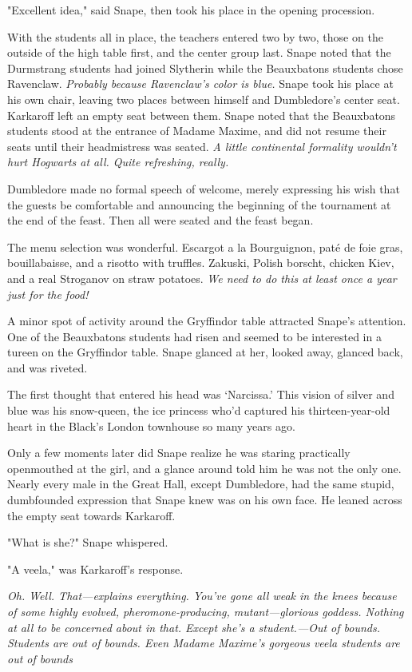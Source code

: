 "Excellent idea," said Snape, then took his place in the opening procession.

With the students all in place, the teachers entered two by two, those on the outside of the high table first, and the center group last. Snape noted that the Durmstrang students had joined Slytherin while the Beauxbatons students chose Ravenclaw. \emph{Probably because Ravenclaw's color is blue.} Snape took his place at his own chair, leaving two places between himself and Dumbledore's center seat. Karkaroff left an empty seat between them. Snape noted that the Beauxbatons students stood at the entrance of Madame Maxime, and did not resume their seats until their headmistress was seated. \emph{A little continental formality wouldn't hurt Hogwarts at all. Quite refreshing, really.}

Dumbledore made no formal speech of welcome, merely expressing his wish that the guests be comfortable and announcing the beginning of the tournament at the end of the feast. Then all were seated and the feast began.

The menu selection was wonderful. Escargot a la Bourguignon, paté de foie gras, bouillabaisse, and a risotto with truffles. Zakuski, Polish borscht, chicken Kiev, and a real Stroganov on straw potatoes. \emph{We need to do this at least once a year just for the food!}

A minor spot of activity around the Gryffindor table attracted Snape's attention. One of the Beauxbatons students had risen and seemed to be interested in a tureen on the Gryffindor table. Snape glanced at her, looked away, glanced back, and was riveted.

The first thought that entered his head was `Narcissa.' This vision of silver and blue was his snow-queen, the ice princess who'd captured his thirteen-year-old heart in the Black's London townhouse so many years ago.

Only a few moments later did Snape realize he was staring practically openmouthed at the girl, and a glance around told him he was not the only one. Nearly every male in the Great Hall, except Dumbledore, had the same stupid, dumbfounded expression that Snape knew was on his own face. He leaned across the empty seat towards Karkaroff.

"What is she?" Snape whispered.

"A veela," was Karkaroff's response.

\emph{Oh. Well. That—explains everything. You've gone all{\el} weak in the knees because of some{\el} highly evolved, pheromone-producing, mutant—glorious goddess. Nothing at all to be concerned about in that. Except she's a student.—Out of bounds. Students are out of bounds. Even Madame Maxime's gorgeous veela students are{\el} out of{\el} bounds{\el}}

